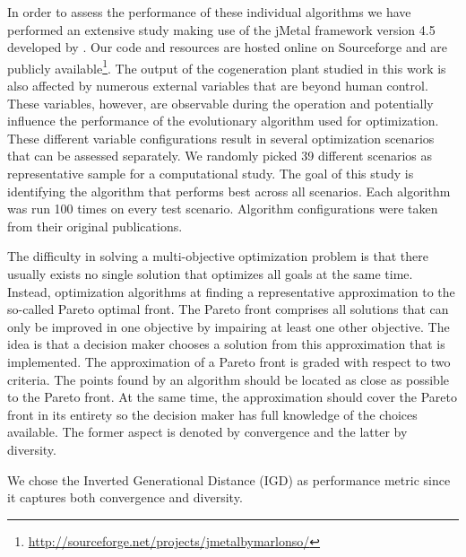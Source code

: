 
In order to assess the performance of these individual algorithms we have performed an extensive study making use of the jMetal framework version 4.5 developed by \cite{jmetal2}. Our code and resources are hosted online on Sourceforge and are publicly available\footnote{\url{http://sourceforge.net/projects/jmetalbymarlonso/}}. The output of the cogeneration plant studied in this work is also affected by numerous external variables  that are beyond human control. These variables, however, are observable during the operation and potentially influence the performance of the evolutionary algorithm used for optimization. These different variable configurations result in several optimization scenarios that can be assessed separately. We randomly picked 39 different scenarios as representative sample for a computational study. The goal of this study is identifying the algorithm that performs best across all scenarios. Each algorithm was run 100 times on every test scenario. Algorithm configurations were taken from their original publications.

The difficulty in solving a multi-objective optimization problem is that there usually exists no single solution that optimizes all goals at the same time. Instead, optimization algorithms at finding a representative approximation to the so-called Pareto optimal front. The Pareto front comprises all solutions that can only be improved in one objective by impairing at least one other objective. The idea is that a decision maker chooses a solution from this approximation that is implemented. The approximation of a Pareto front is graded with respect to two criteria. The points found by an algorithm should be located as close as possible to the Pareto front. At the same time, the approximation should cover the Pareto front in its entirety so the decision maker has full knowledge of the choices available. The former aspect is denoted by convergence and the latter by diversity.

We chose the Inverted Generational Distance (IGD) as performance metric since it captures both convergence and diversity.





